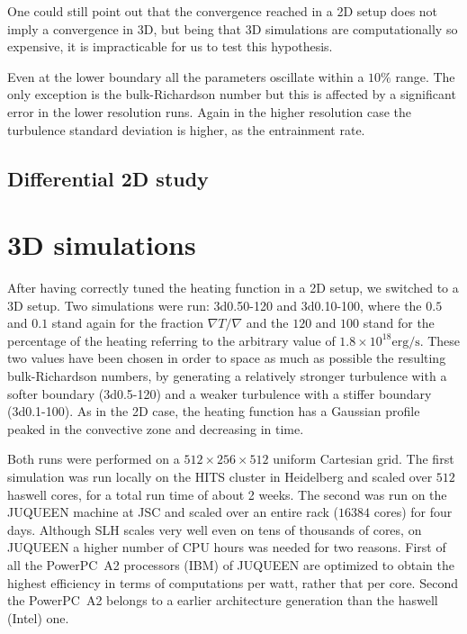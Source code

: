 One could still point out that the convergence reached in a 2D setup does not imply a convergence in 3D, but being that 3D simulations are computationally so expensive, it is impracticable for us to test this hypothesis.

Even at the lower boundary all the parameters oscillate within a $10 \%$ range. The only exception is the bulk-Richardson number but this is affected by a significant error in the lower resolution runs. Again in the higher resolution case the turbulence standard deviation is higher, as the entrainment rate.



\subsection{Differential 2D study}


\section{3D simulations}


	After having correctly tuned the heating function in a 2D setup, we switched to a 3D setup. Two simulations were run: 3d0.50-120 and 3d0.10-100, where the $0.5$ and $0.1$ stand again for the fraction $\nabla T / \nabla$ and the $120$ and $100$ stand for the percentage of the heating referring to the arbitrary value of $1.8 \times 10^{18} \mathrm{erg/s}$. These two values have been chosen in order to space as much as possible the resulting bulk-Richardson numbers, by generating a relatively stronger turbulence with a softer boundary (3d0.5-120) and a weaker turbulence with a stiffer boundary (3d0.1-100). As in the 2D case, the heating function has a Gaussian profile peaked in the convective zone and decreasing in time.

	Both runs were performed on a $512 \times 256 \times 512$ uniform Cartesian grid. The first simulation was run locally on the HITS cluster in Heidelberg and scaled over $512$ haswell cores, for a total run time of about 2 weeks. The second was run on the JUQUEEN machine at JSC and scaled over an entire rack ($16384$ cores) for four days. Although SLH scales very well even on tens of thousands of cores, on JUQUEEN a higher number of CPU hours was needed for two reasons. First of all the PowerPC\textregistered \ A2 processors (IBM) of JUQUEEN are optimized to obtain the highest efficiency in terms of computations per watt, rather that per core. Second the PowerPC\textregistered \ A2 belongs to a earlier architecture generation than the haswell (Intel) one.

